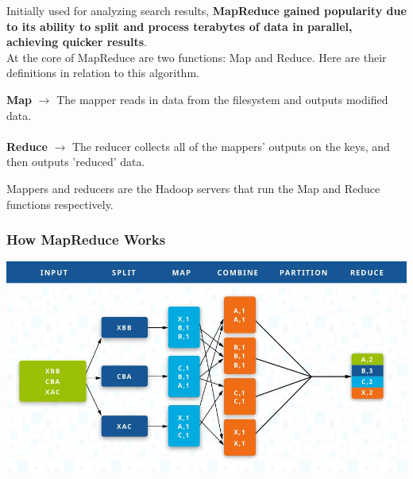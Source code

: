\documentclass[english, 10pt]{article}
\begin{document}
Initially used for analyzing search results, \textbf{MapReduce gained popularity due to its ability to split and process terabytes of data in parallel, achieving quicker results}.\\

At the core of MapReduce are two functions: Map and Reduce. Here are their definitions in relation to this algorithm.\\

\begin{tcolorbox}[title=Definition:,colframe=red!75!black,colback=red!5!white,arc=0pt,fonttitle=\bfseries]
\textbf{Map} $\rightarrow$ The mapper reads in data from the filesystem and outputs modified data.\\\\
\textbf{Reduce} $\rightarrow$ The reducer collects all of the mappers' outputs on the keys, and then outputs 'reduced' data.
\end{tcolorbox}

\hfill \break Mappers and reducers are the Hadoop servers that run the Map and Reduce functions respectively.\\

\subsubsection{How MapReduce Works}

\includegraphics[scale=0.47]{img/mapreduce.jpg} \\
\end{document}
